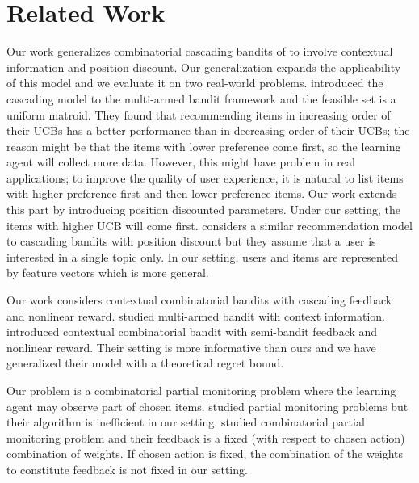 \documentclass{article}
\begin{document}

\section{Related Work}

Our work generalizes combinatorial cascading bandits of \cite{kveton2015combinatorial} to involve contextual information and position discount. Our generalization expands the applicability of this model and we evaluate it on two real-world problems. \cite{kveton2015cascading} introduced the cascading model to the multi-armed bandit framework and the feasible set is a uniform matroid. They found that recommending items in increasing order of their UCBs has a better performance than in decreasing order of their UCBs; the reason might be that the items with lower preference come first, so the learning agent will collect more data. However, this might have problem in real applications; to improve the quality of user experience, it is natural to list items with higher preference first and then lower preference items. Our work extends this part by introducing position discounted parameters. Under our setting, the items with higher UCB will come first. \cite{combes2015learning} considers a similar recommendation model to cascading bandits with position discount but they assume that a user is interested in a single topic only. In our setting, users and items are represented by feature vectors which is more general.

Our work considers contextual combinatorial bandits with cascading feedback and nonlinear reward. \cite{li2010contextual} studied multi-armed bandit with context information. \cite{qin2014contextual} introduced contextual combinatorial bandit with semi-bandit feedback and nonlinear reward. Their setting is more informative than ours and we have generalized their model with a theoretical regret bound.

Our problem is a combinatorial partial monitoring problem where the learning agent may observe part of chosen items. \cite{agrawal1989asymptotically,bartok2012adaptive} studied partial monitoring problems but their algorithm is inefficient in our setting. \cite{lin2014combinatorial} studied combinatorial partial monitoring problem and their feedback is a fixed (with respect to chosen action) combination of weights. If chosen action is fixed, the combination of the weights to constitute feedback is not fixed in our setting.
\end{document}
